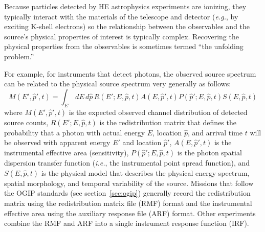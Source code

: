 \documentclass[11pt,a4paper]{ivoa}
\begin{document}
Because particles detected by HE astrophysics experiments are ionizing, they typically interact with the materials of the telescope and detector ({\em e.g.\/}, by exciting K-shell electrons) so the relationship between the observables and the source's physical properties of interest is typically complex.  Recovering the physical properties from the observables is sometimes termed ``the unfolding problem.''

For example, for instruments that detect photons, the observed source spectrum can be related to the physical source spectrum very generally as follows:
\begin{equation}\label{eqn:phaspec}
M(E', \hat{p}', t) = \int_{E'} dE\, d\hat{p}\, R(E'; E, \hat{p}, t) A(E, \hat{p}', t) P(\hat{p}'; E, \hat{p}, t) S(E, \hat{p}, t)
\end{equation}
where $M(E', \hat{p}', t)$ is the expected observed channel distribution of detected source counts, $R(E'; E, \hat{p}, t)$ is the redistribution matrix that defines the probability that a photon with actual energy $E$, location $\hat{p}$, and arrival time $t$ will be observed with apparent energy $E'$ and location $\hat{p}'$, $A(E, \hat{p}', t)$ is the instrumental effective area (sensitivity), $P(\hat{p}'; E, \hat{p}, t)$ is the photon spatial dispersion transfer function ({\em i.e.\/}, the instrumental point spread function), and  $S(E, \hat{p}, t)$ is the physical model that describes the physical energy spectrum, spatial morphology, and temporal variability of the source.  Missions that follow the OGIP standards (see section~\ref{sec:ogip}) generally record the redistribution matrix using the redistribution matrix file (RMF) format and the instrumental effective area using the auxiliary response file (ARF) format.  Other experiments combine the RMF and ARF into a single instrument response function (IRF).
\end{document}
